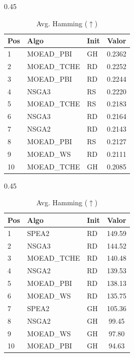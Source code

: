 \documentclass[a4paper,10pt]{article} %
\begin{document}
\begin{table}[H]
    \centering
    \begin{subtable}[t]{0.45\textwidth}
        \centering
        \caption{Avg. Tolerance Rate ($\uparrow$)}
        \begin{tabular}{lllc}
            \toprule
            Pos & Algo & Init & Valor \\
            \midrule
            1 & MOEAD\_PBI & GH & 0.2362 \\
            2 & MOEAD\_TCHE & RD & 0.2252 \\
            3 & MOEAD\_PBI & RD & 0.2244 \\
            4 & NSGA3 & RS & 0.2220 \\
            5 & MOEAD\_TCHE & RS & 0.2183 \\
            6 & NSGA3 & RD & 0.2164 \\
            7 & NSGA2 & RD & 0.2143 \\
            8 & MOEAD\_PBI & RS & 0.2127 \\
            9 & MOEAD\_WS & RD & 0.2111 \\
            10 & MOEAD\_TCHE & GH & 0.2085 \\
            \bottomrule
        \end{tabular}
    \end{subtable}
    \hfill
    \begin{subtable}[t]{0.45\textwidth}
        \centering
        \caption{Avg. Hamming ($\uparrow$)}
        \begin{tabular}{lllc}
            \toprule
            Pos & Algo & Init & Valor \\
            \midrule
            1 & SPEA2 & RD & 149.59 \\
            2 & NSGA3 & RD & 144.52 \\
            3 & MOEAD\_TCHE & RD & 140.48 \\
            4 & NSGA2 & RD & 139.53 \\
            5 & MOEAD\_PBI & RD & 138.13 \\
            6 & MOEAD\_WS & RD & 135.75 \\
            7 & SPEA2 & GH & 105.36 \\
            8 & NSGA2 & GH & 99.45 \\
            9 & MOEAD\_WS & GH & 97.80 \\
            10 & MOEAD\_PBI & GH & 94.63 \\
            \bottomrule
        \end{tabular}
    \end{subtable}
\end{table}
\end{document}
